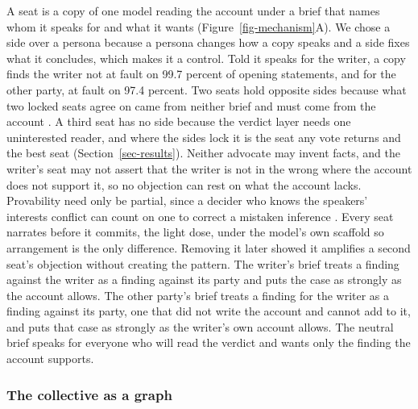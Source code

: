 A seat is a copy of one model reading the account under a brief that
names whom it speaks for and what it wants
(Figure~\ref{fig-mechanism}A).
We chose a side over a persona because a persona changes how a copy
speaks and a side fixes what it concludes, which makes it a control.
Told it speaks for the writer, a copy finds the writer not at fault on
99.7 percent of opening statements, and for the other party, at fault on
97.4
percent.
Two seats hold opposite sides because what two locked seats agree on
came from neither brief and must come from the account
\citep{milgrom1986relying,dewatripont1999advocates}.
A third seat has no side because the verdict layer needs one uninterested
reader, and where the sides lock it is the seat any vote returns and the
best seat (Section~\ref{sec-results}).
Neither advocate may invent facts, and the writer's seat may not assert
that the writer is not in the wrong where the account does not support
it, so no objection can rest on what the account lacks. Provability need
only be partial, since a decider who knows the speakers' interests
conflict can count on one to correct a mistaken inference
\citep{lipman1995robust}.
Every seat narrates before it commits, the light dose, under the model's
own scaffold so arrangement is the only
difference.
Removing it later showed it amplifies a second seat's objection without
creating the pattern.
The writer's brief treats a finding against the writer as a finding
against its party and puts the case as strongly as the account allows. The
other party's brief treats a finding for the writer as a finding against
its party, one that did not write the account and cannot add to it, and
puts that case as strongly as the writer's own account allows. The
neutral brief speaks for everyone who will read the verdict and wants only
the finding the account supports.

\subsubsection{The collective as a graph}
\label{sec-method-collective}

